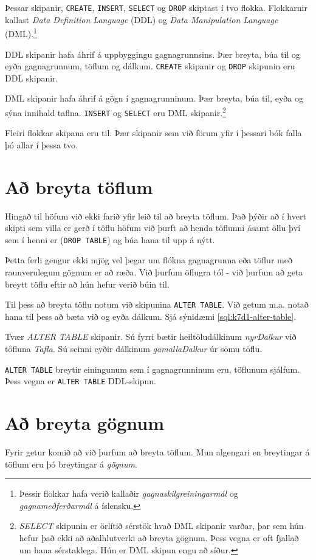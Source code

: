 Þessar skipanir, \verb|CREATE|, \verb|INSERT|, \verb|SELECT| og \verb|DROP| skiptast í tvo flokka. Flokkarnir kallast \emph{Data Definition Language} (DDL) og \emph{Data Manipulation Language} (DML).\footnote{Þessir flokkar hafa verið kallaðir \emph{gagnaskilgreiningarmál} og \emph{gagnameðferðarmál} á íslensku.}

DDL skipanir hafa áhrif á uppbyggingu gagnagrunnsins. Þær breyta, búa til og eyða gagnagrunnum, töflum og dálkum. \verb|CREATE| skipanir og \verb|DROP| skipunin eru DDL skipanir.

DML skipanir hafa áhrif á gögn í gagnagrunninum. Þær breyta, búa til, eyða og sýna innihald taflna. \verb|INSERT| og \verb|SELECT| eru DML skipanir.\footnote{\emph{SELECT} skipunin er örlítið sérstök hvað DML skipanir varðar, þar sem hún hefur það ekki að aðalhlutverki að breyta gögnum. Þess vegna er oft fjallað um hana sérstaklega. Hún er DML skipun engu að síður.}

Fleiri flokkar skipana eru til. Þær skipanir sem við förum yfir í þessari bók falla þó allar í þessa tvo.
\section{Að breyta töflum}
Hingað til höfum við ekki farið yfir leið til að breyta töflum. Það þýðir að í hvert skipti sem villa er gerð í töflu höfum við þurft að henda töflunni ásamt öllu því sem í henni er (\verb|DROP TABLE|) og búa hana til upp á nýtt.

Þetta ferli gengur ekki mjög vel þegar um flókna gagnagrunna eða töflur með raunverulegum gögnum er að ræða. Við þurfum öflugra tól - við þurfum að geta breytt töflu eftir að hún hefur verið búin til.

Til þess að breyta töflu notum við skipunina \verb|ALTER TABLE|. Við getum m.a. notað hana til þess að bæta við og eyða dálkum. Sjá sýnidæmi \ref{sql:k7d1-alter-table}.

\begin{example}
\caption[ALTER TABLE]{Tvær \emph{ALTER TABLE} skipanir. Sú fyrri bætir heiltöludálkinum \emph{nyrDalkur} við töfluna \emph{Tafla}. Sú seinni eyðir dálkinum \emph{gamallaDalkur} úr sömu töflu.}
\label{sql:k7d1-alter-table}
\centering
{}
\end{example}

\verb|ALTER TABLE| breytir einingunum sem í gagnagrunninum eru, töflunum sjálfum. Þess vegna er \verb|ALTER TABLE| DDL-skipun.
\section{Að breyta gögnum}
Fyrir getur komið að við þurfum að breyta töflum. Mun algengari en breytingar á töflum eru þó breytingar á \emph{gögnum}.

